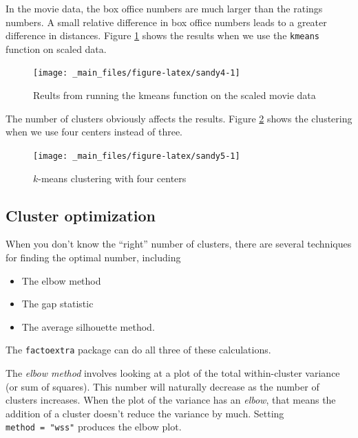 \documentclass[
]{book}
\theoremstyle{definition}
\theoremstyle{definition}
\theoremstyle{definition}
\theoremstyle{definition}
\theoremstyle{remark}
\begin{document}
In the movie data, the box office numbers are much larger than the ratings numbers. A small relative difference in box office numbers leads to a greater difference in distances. Figure \ref{fig:sandy4} shows the results when we use the \texttt{kmeans} function on scaled data.

\begin{figure}

{\centering \texttt{[image: \_main\_files/figure-latex/sandy4-1]} 

}

\caption{Reults from running the kmeans function on the scaled movie data}\label{fig:sandy4}
\end{figure}

The number of clusters obviously affects the results. Figure \ref{fig:sandy5} shows the clustering when we use four centers instead of three.

\begin{figure}

{\centering \texttt{[image: \_main\_files/figure-latex/sandy5-1]} 

}

\caption{$k$-means clustering with four centers}\label{fig:sandy5}
\end{figure}

\subsection*{Cluster optimization}\label{cluster-optimization}

When you don't know the ``right'' number of clusters, there are several techniques for finding the optimal number, including

\begin{itemize}
\item
  The elbow method
\item
  The gap statistic
\item
  The average silhouette method.
\end{itemize}

The \texttt{factoextra} package can do all three of these calculations.

The \emph{elbow method} involves looking at a plot of the total within-cluster variance (or sum of squares). This number will naturally decrease as the number of clusters increases. When the plot of the variance has an \emph{elbow}, that means the addition of a cluster doesn't reduce the variance by much. Setting \texttt{method\ =\ "wss"} produces the elbow plot.
\end{document}
